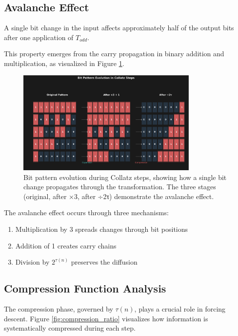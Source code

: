 \subsection{Avalanche Effect}

\begin{theorem}\label{thm:avalanche}
A single bit change in the input affects approximately half of the output bits after one application of $T_{odd}$.
\end{theorem}

This property emerges from the carry propagation in binary addition and multiplication, as visualized in Figure \ref{fig:bit_patterns}.

\begin{figure}[h]
\centering
\includegraphics[width=0.8\textwidth]{figures/bit_patterns.svg}
\caption{Bit pattern evolution during Collatz steps, showing how a single bit change propagates through the transformation. The three stages (original, after ×3, after ÷2τ) demonstrate the avalanche effect.}
\label{fig:bit_patterns}
\end{figure}

The avalanche effect occurs through three mechanisms:
\begin{enumerate}
\item Multiplication by 3 spreads changes through bit positions
\item Addition of 1 creates carry chains
\item Division by $2^{\tau(n)}$ preserves the diffusion
\end{enumerate}

\subsection{Compression Function Analysis}

The compression phase, governed by $\tau(n)$, plays a crucial role in forcing descent. Figure \ref{fig:compression_ratio} visualizes how information is systematically compressed during each step.

